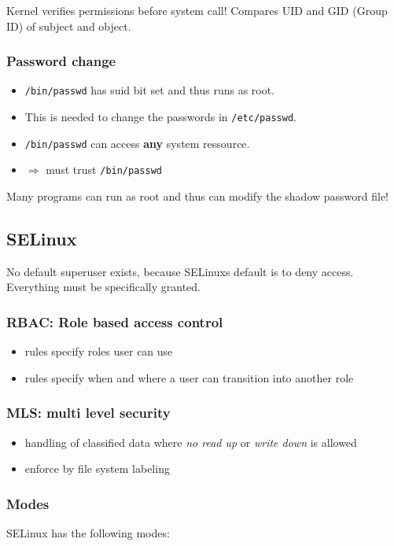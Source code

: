Kernel verifies permissions before system call! Compares UID and GID (Group ID) of subject and object.

\subsubsection{Password change}
\begin{itemize}
  \item \texttt{/bin/passwd} has suid bit set and thus runs as root.
  \item This is needed to change the passwords in \texttt{/etc/passwd}.
  \item \texttt{/bin/passwd} can access \textbf{any} system ressource.
  \item $\Rightarrow$ must trust \texttt{/bin/passwd}
\end{itemize}
Many programs can run as root and thus can modify the
shadow password file!


\subsection{SELinux}
No default superuser exists, because SELinuxs default is to deny access. Everything must be specifically granted.

\subsubsection{RBAC: Role based access control}
\begin{itemize}
  \item rules specify roles user can use
  \item rules specify when and where a user can transition into another role
\end{itemize}

\subsubsection{MLS:  multi level security}
\begin{itemize}
  \item handling of classified data where \textit{no read up} or \textit{write down} is allowed
  \item enforce by file system labeling
\end{itemize}

\subsubsection{Modes}
SELinux has the following modes:

